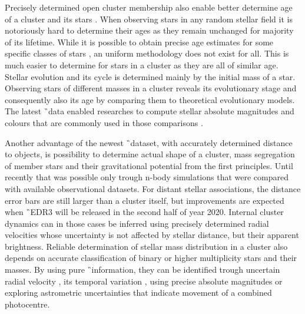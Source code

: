 Precisely determined open cluster membership also enable better determine age of a cluster and its stars \citep{2018ApJ...863...65C}. When observing stars in any random stellar field it is notoriously hard to determine their ages as they remain unchanged for majority of its lifetime. While it is possible to obtain precise age estimates for some specific classes of stars \citep{2010ARA&A..48..581S}, an uniform methodology does not exist for all. This is much easier to determine for stars in a cluster as they are all of similar age. Stellar evolution and its cycle is determined mainly by the initial mass of a star. Observing stars of different masses in a cluster reveals its evolutionary stage and consequently also its age by comparing them to theoretical evolutionary models. The latest \G\ data enabled researches to compute stellar absolute magnitudes and colours that are commonly used in those comparisons \citep{2019MNRAS.487.2385M, 2019A&A...623A.108B, 2019A&A...631A.166K}.

Another advantage of the newest \G\ dataset, with accurately determined distance to objects, is possibility to determine actual shape of a cluster, mass segregation of member stars and their gravitational potential from the first principles. Until recently that was possible only trough n-body simulations \citep{1987MNRAS.224..193T, 2016MNRAS.456.3757S, 2018MNRAS.473..849D} that were compared with available observational datasets. For distant stellar associations, the distance error bars are still larger than a cluster itself, but improvements are expected when \G\ EDR3 will be released in the second half of year 2020. Internal cluster dynamics can in those cases be inferred using precisely determined radial velocities whose uncertainty is not affected by stellar distance, but their apparent brightness. Reliable determination of stellar mass distribution in a cluster also depends on accurate classification of binary or higher multiplicity stars and their masses. By using pure \G\ information, they can be identified trough uncertain radial velocity \citep{2018RNAAS...2b..20E}, its temporal variation \citep{2019AJ....158..155B}, using precise absolute magnitudes \citep{2018ApJ...857..114W, 2018A&A...616A..10G, 2019MNRAS.487.2474} or exploring astrometric uncertainties \citep{2020arXiv200305467B} that indicate movement of a combined photocentre. 

